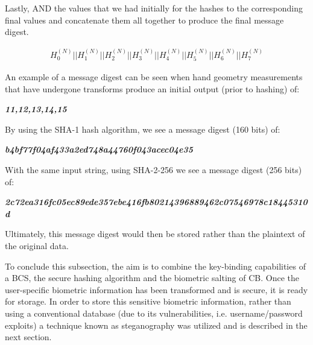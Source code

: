         Lastly, AND the values that we had initially for the hashes to the corresponding final values and concatenate them all together to produce the final message digest.
        
        
        \begin{gather}
            H^{(N)}_0 || H^{(N)}_1 ||H^{(N)}_2 || H^{(N)}_3 || H^{(N)}_4 || H^{(N)}_5 || H^{(N)}_6 || H^{(N)}_7 
        \end{gather} 
        
        An example of a message digest can be seen when hand geometry measurements that have undergone transforms produce an initial output (prior to hashing) of: 

        \begin{center}
            \textbf{\textit{11,12,13,14,15}}
        \end{center}
        
        By using the SHA-1 hash algorithm, we see a message digest (160 bits) of:
        
        \begin{center}
            \textbf{\textit{b4bf77f04af433a2ed748a44760f043acec04e35}}
        \end{center}
        
        With the same input string, using SHA-2-256 we see a message digest (256 bits) of:
        
        \begin{center}
            \textbf{\textit{2c72ea316fc05ec89ede357ebe416fb80214396889462c07546978c18445310d}}
        \end{center}
        
    

Ultimately, this message digest would then be stored rather than the plaintext of the original data.

To conclude this subsection, the aim is to combine the key-binding capabilities of a BCS, the secure hashing algorithm and the biometric salting of CB. Once the user-specific biometric information has been transformed and is secure, it is ready for storage. In order to store this sensitive biometric information, rather than using a conventional database (due to its vulnerabilities, i.e. username/password exploits) a technique known as steganography was utilized and is described in the next section. 


